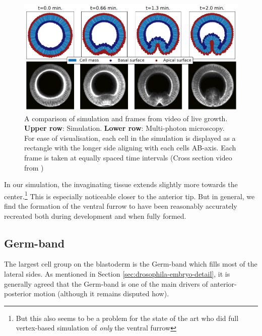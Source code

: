 \begin{figure}[H]
    \centering
    \includegraphics[width=1\linewidth]{chapters/Results/figures/VF_comparison.png}
    \caption{A comparison of simulation and frames from video of live growth. \\\textbf{Upper row}: Simulation. \textbf{Lower row}: Multi-photon microscopy. \\For ease of visualisation, each cell in the simulation is displayed as a rectangle with the longer side aligning with each cells AB-axis. Each frame is taken at equally spaced time intervals (Cross section video from )}
    \label{fig:VFComparison}
\end{figure}

In our simulation, the invaginating tissue extends slightly more towards the center.\footnote{But this also seems to be a problem for the state of the art  who did full vertex-based simulation of \textit{only} the ventral furrow}  This is especially noticeable closer to the anterior tip.
But in general, we find the formation of the ventral furrow to have been reasonably accurately recreated both during development and when fully formed. 


\subsection{Germ-band}
The largest cell group on the blastoderm is the Germ-band which fills most of the lateral sides. As mentioned in Section \ref{sec:drosophila-embryo-detail}, it is generally agreed that the Germ-band is one of the main drivers of anterior-posterior motion (although it remains disputed how).

